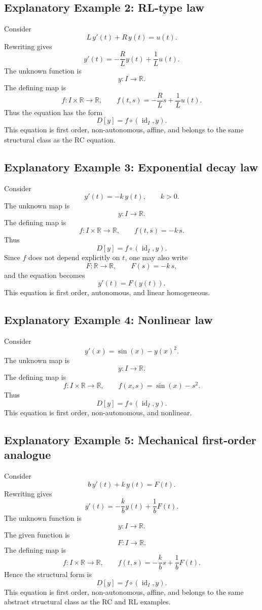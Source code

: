 \documentclass[12pt]{article}
\begin{document}
	\subsection*{Explanatory Example 2: RL-type law}
	
	Consider
	$$
	L\,y'(t)+R\,y(t)=u(t).
	$$
	Rewriting gives
	$$
	y'(t)=-\frac{R}{L}y(t)+\frac{1}{L}u(t).
	$$
	The unknown function is
	$$
	y:I\to\mathbb{R}.
	$$
	The defining map is
	$$
	f:I\times\mathbb{R}\to\mathbb{R},
	\qquad
	f(t,s)=-\frac{R}{L}s+\frac{1}{L}u(t).
	$$
	Thus the equation has the form
	$$
	D[y]=f\circ(\operatorname{id}_I,y).
	$$
	This equation is first order, non-autonomous, affine, and belongs to the same structural class as the RC equation.
	
	\subsection*{Explanatory Example 3: Exponential decay law}
	
	Consider
	$$
	y'(t)=-k\,y(t),
	\qquad k>0.
	$$
	The unknown map is
	$$
	y:I\to\mathbb{R}.
	$$
	The defining map is
	$$
	f:I\times\mathbb{R}\to\mathbb{R},
	\qquad
	f(t,s)=-k\,s.
	$$
	Thus
	$$
	D[y]=f\circ(\operatorname{id}_I,y).
	$$
	Since \(f\) does not depend explicitly on \(t\), one may also write
	$$
	F:\mathbb{R}\to\mathbb{R},
	\qquad
	F(s)=-k\,s,
	$$
	and the equation becomes
	$$
	y'(t)=F(y(t)).
	$$
	This equation is first order, autonomous, and linear homogeneous.
	
	\subsection*{Explanatory Example 4: Nonlinear law}
	
	Consider
	$$
	y'(x)=\sin(x)-y(x)^2.
	$$
	The unknown map is
	$$
	y:I\to\mathbb{R}.
	$$
	The defining map is
	$$
	f:I\times\mathbb{R}\to\mathbb{R},
	\qquad
	f(x,s)=\sin(x)-s^2.
	$$
	Thus
	$$
	D[y]=f\circ(\operatorname{id}_I,y).
	$$
	This equation is first order, non-autonomous, and nonlinear.
	
	\subsection*{Explanatory Example 5: Mechanical first-order analogue}
	
	Consider
	$$
	b\,y'(t)+k\,y(t)=F(t).
	$$
	Rewriting gives
	$$
	y'(t)=-\frac{k}{b}y(t)+\frac{1}{b}F(t).
	$$
	The unknown function is
	$$
	y:I\to\mathbb{R}.
	$$
	The given function is
	$$
	F:I\to\mathbb{R}.
	$$
	The defining map is
	$$
	f:I\times\mathbb{R}\to\mathbb{R},
	\qquad
	f(t,s)=-\frac{k}{b}s+\frac{1}{b}F(t).
	$$
	Hence the structural form is
	$$
	D[y]=f\circ(\operatorname{id}_I,y).
	$$
	This equation is first order, non-autonomous, affine, and belongs to the same abstract structural class as the RC and RL examples.
	
\end{document}
